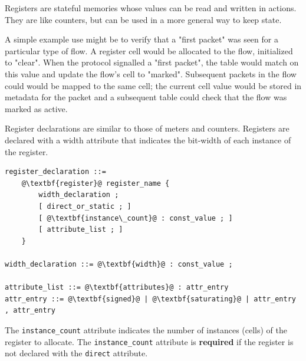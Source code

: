 \documentclass[12pt]{article}
\begin{document}
Registers are stateful memories whose values can be read and written
in actions.  They are like counters, but can be used in a more general
way to keep state.

A simple example use might be to verify that a "first packet" was seen
for a particular type of flow. A register cell would be allocated to
the flow, initialized to "clear". When the protocol signalled a "first
packet", the table would match on this value and update the flow's
cell to "marked".  Subsequent packets in the flow could would be
mapped to the same cell; the current cell value would be stored in
metadata for the packet and a subsequent table could check that the
flow was marked as active.

Register declarations are similar to those of meters and
counters. {\color{red} Registers are declared with a width
attribute that indicates the bit-width of each instance of
the register.}

\begin{lstlisting}[frame=single,backgroundcolor=\color{bnfgreen},escapechar=\@]
register_declaration ::= 
    @\textbf{register}@ register_name {
        width_declaration ;
        [ direct_or_static ; ]
        [ @\textbf{instance\_count}@ : const_value ; ]
        [ attribute_list ; ]
    }

width_declaration ::= @\textbf{width}@ : const_value ;

attribute_list ::= @\textbf{attributes}@ : attr_entry
attr_entry ::= @\textbf{signed}@ | @\textbf{saturating}@ | attr_entry , attr_entry
\end{lstlisting}


The \texttt{instance_count} attribute indicates the number of 
instances (cells) of the register to allocate. The 
\texttt{instance_count} attribute is \textbf{required} if the 
register is not declared with the \texttt{direct} attribute.

%
%
%
%
\end{document}
